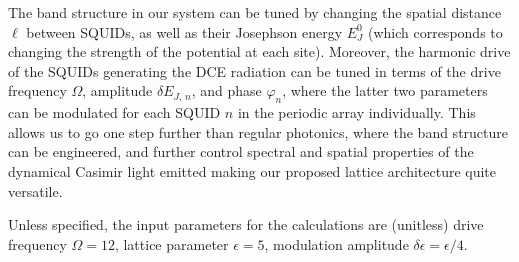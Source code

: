 The band structure in our system can be tuned by changing the spatial distance $\ell$ between SQUIDs, as well as their Josephson energy $E_J^0$ (which corresponds to changing the strength of the potential at each site). Moreover, the harmonic drive of the SQUIDs generating the DCE radiation can be tuned in terms of the drive frequency $\Omega$, amplitude $\delta E_{J,\,n}$, and phase $\varphi_n$, where the latter two parameters can be modulated for each SQUID $n$ in the periodic array individually. This allows us to go one step further than regular photonics, where the band structure can be engineered, and further control spectral and spatial properties of the dynamical Casimir light emitted making our proposed lattice architecture quite versatile. 

Unless specified, the input parameters for the calculations are (unitless) drive frequency $\Omega= 12$, lattice parameter $\epsilon = 5$, modulation amplitude $\delta \epsilon = \epsilon/4$.


\newpage

